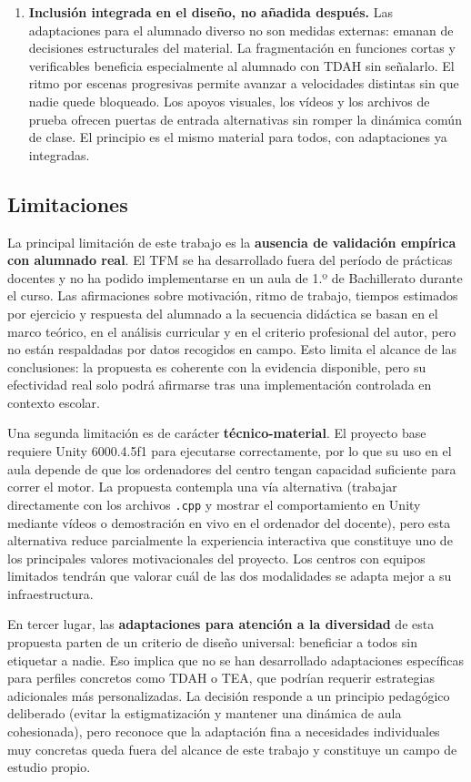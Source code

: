 \documentclass[a4paper,12pt]{article}
\begin{document}
\begin{enumerate}
  \item \textbf{Inclusión integrada en el diseño, no añadida después.}
  Las adaptaciones para el alumnado diverso no son medidas externas: emanan de decisiones estructurales del material. La fragmentación en funciones cortas y verificables beneficia especialmente al alumnado con TDAH sin señalarlo. El ritmo por escenas progresivas permite avanzar a velocidades distintas sin que nadie quede bloqueado. Los apoyos visuales, los vídeos y los archivos de prueba ofrecen puertas de entrada alternativas sin romper la dinámica común de clase. El principio es el mismo material para todos, con adaptaciones ya integradas.

\end{enumerate}


\subsection{Limitaciones}

La principal limitación de este trabajo es la \textbf{ausencia de validación empírica con alumnado real}. El TFM se ha desarrollado fuera del período de prácticas docentes y no ha podido implementarse en un aula de \mbox{1.º} de Bachillerato durante el curso. Las afirmaciones sobre motivación, ritmo de trabajo, tiempos estimados por ejercicio y respuesta del alumnado a la secuencia didáctica se basan en el marco teórico, en el análisis curricular y en el criterio profesional del autor, pero no están respaldadas por datos recogidos en campo. Esto limita el alcance de las conclusiones: la propuesta es coherente con la evidencia disponible, pero su efectividad real solo podrá afirmarse tras una implementación controlada en contexto escolar.

Una segunda limitación es de carácter \textbf{técnico-material}. El proyecto base requiere Unity \mbox{6000.4.5f1} para ejecutarse correctamente, por lo que su uso en el aula depende de que los ordenadores del centro tengan capacidad suficiente para correr el motor. La propuesta contempla una vía alternativa (trabajar directamente con los archivos \texttt{.cpp} y mostrar el comportamiento en Unity mediante vídeos o demostración en vivo en el ordenador del docente), pero esta alternativa reduce parcialmente la experiencia interactiva que constituye uno de los principales valores motivacionales del proyecto. Los centros con equipos limitados tendrán que valorar cuál de las dos modalidades se adapta mejor a su infraestructura.

En tercer lugar, las \textbf{adaptaciones para atención a la diversidad} de esta propuesta parten de un criterio de diseño universal: beneficiar a todos sin etiquetar a nadie. Eso implica que no se han desarrollado adaptaciones específicas para perfiles concretos como TDAH o TEA, que podrían requerir estrategias adicionales más personalizadas. La decisión responde a un principio pedagógico deliberado (evitar la estigmatización y mantener una dinámica de aula cohesionada), pero reconoce que la adaptación fina a necesidades individuales muy concretas queda fuera del alcance de este trabajo y constituye un campo de estudio propio.
\end{document}
